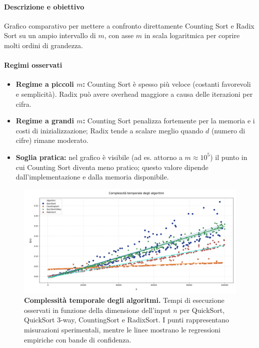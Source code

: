 \documentclass[a4paper, 11pt]{article}
\begin{document}
\paragraph{Descrizione e obiettivo}
Grafico comparativo per mettere a confronto direttamente Counting Sort e Radix Sort su un ampio intervallo di \(m\), con asse \(m\) in scala logaritmica per coprire molti ordini di grandezza.

\paragraph{Regimi osservati}
\begin{itemize}
  \item \textbf{Regime a piccoli \(m\):} Counting Sort è spesso più veloce (costanti favorevoli e semplicità). Radix può avere overhead maggiore a causa delle iterazioni per cifra.
  \item \textbf{Regime a grandi \(m\):} Counting Sort penalizza fortemente per la memoria e i costi di inizializzazione; Radix tende a scalare meglio quando \(d\) (numero di cifre) rimane moderato.
  \item \textbf{Soglia pratica:} nel grafico è visibile (ad es. attorno a \(m\approx 10^5\)) il punto in cui Counting Sort diventa meno pratico; questo valore dipende dall'implementazione e dalla memoria disponibile.
\end{itemize}

\begin{figure} [H]
    \centering
    \includegraphics[width=1\textwidth]{./Immagini/Grafico.png}
    \caption*{\textbf{Complessità temporale degli algoritmi.} Tempi di esecuzione osservati in funzione della dimensione dell’input \(n\) per QuickSort, QuickSort 3-way, CountingSort e RadixSort. I punti rappresentano misurazioni sperimentali, mentre le linee mostrano le regressioni empiriche con bande di confidenza.
    }
\end{figure}
\end{document}
